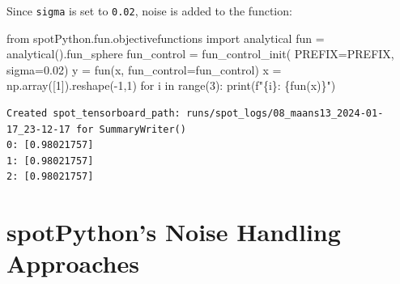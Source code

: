 \documentclass[
  letterpaper,
  DIV=11,
  numbers=noendperiod]{scrreprt}
\newenvironment{Shaded}{\begin{snugshade}}{\end{snugshade}}
\newcommand{\BuiltInTok}[1]{\textcolor[rgb]{0.00,0.23,0.31}{#1}}
\newcommand{\ControlFlowTok}[1]{\textcolor[rgb]{0.00,0.23,0.31}{#1}}
\newcommand{\DecValTok}[1]{\textcolor[rgb]{0.68,0.00,0.00}{#1}}
\newcommand{\FloatTok}[1]{\textcolor[rgb]{0.68,0.00,0.00}{#1}}
\newcommand{\ImportTok}[1]{\textcolor[rgb]{0.00,0.46,0.62}{#1}}
\newcommand{\KeywordTok}[1]{\textcolor[rgb]{0.00,0.23,0.31}{#1}}
\newcommand{\NormalTok}[1]{\textcolor[rgb]{0.00,0.23,0.31}{#1}}
\newcommand{\OperatorTok}[1]{\textcolor[rgb]{0.37,0.37,0.37}{#1}}
\newcommand{\SpecialCharTok}[1]{\textcolor[rgb]{0.37,0.37,0.37}{#1}}
\newcommand{\SpecialStringTok}[1]{\textcolor[rgb]{0.13,0.47,0.30}{#1}}
\begin{document}
\begin{tcolorbox}[enhanced jigsaw, coltitle=black, bottomrule=.15mm, breakable, toprule=.15mm, colframe=quarto-callout-note-color-frame, title=\textcolor{quarto-callout-note-color}{\faInfo}\hspace{0.5em}{Example: The same noise added to the sphere function}, colbacktitle=quarto-callout-note-color!10!white, opacityback=0, left=2mm, leftrule=.75mm, colback=white, rightrule=.15mm, bottomtitle=1mm, toptitle=1mm, titlerule=0mm, arc=.35mm, opacitybacktitle=0.6]

Since \texttt{sigma} is set to \texttt{0.02}, noise is added to the
function:

\begin{Shaded}
\begin{Highlighting}[]
\ImportTok{from}\NormalTok{ spotPython.fun.objectivefunctions }\ImportTok{import}\NormalTok{ analytical}
\NormalTok{fun }\OperatorTok{=}\NormalTok{ analytical().fun\_sphere}
\NormalTok{fun\_control }\OperatorTok{=}\NormalTok{ fun\_control\_init(}
\NormalTok{    PREFIX}\OperatorTok{=}\NormalTok{PREFIX,}
\NormalTok{    sigma}\OperatorTok{=}\FloatTok{0.02}\NormalTok{)}
\NormalTok{y }\OperatorTok{=}\NormalTok{ fun(x, fun\_control}\OperatorTok{=}\NormalTok{fun\_control)}
\NormalTok{x }\OperatorTok{=}\NormalTok{ np.array([}\DecValTok{1}\NormalTok{]).reshape(}\OperatorTok{{-}}\DecValTok{1}\NormalTok{,}\DecValTok{1}\NormalTok{)}
\ControlFlowTok{for}\NormalTok{ i }\KeywordTok{in} \BuiltInTok{range}\NormalTok{(}\DecValTok{3}\NormalTok{):}
    \BuiltInTok{print}\NormalTok{(}\SpecialStringTok{f"}\SpecialCharTok{\{}\NormalTok{i}\SpecialCharTok{\}}\SpecialStringTok{: }\SpecialCharTok{\{}\NormalTok{fun(x)}\SpecialCharTok{\}}\SpecialStringTok{"}\NormalTok{)}
\end{Highlighting}
\end{Shaded}

\begin{verbatim}
Created spot_tensorboard_path: runs/spot_logs/08_maans13_2024-01-17_23-12-17 for SummaryWriter()
0: [0.98021757]
1: [0.98021757]
2: [0.98021757]
\end{verbatim}

\end{tcolorbox}

\section{spotPython's Noise Handling
Approaches}\label{spotpythons-noise-handling-approaches}
\end{document}
